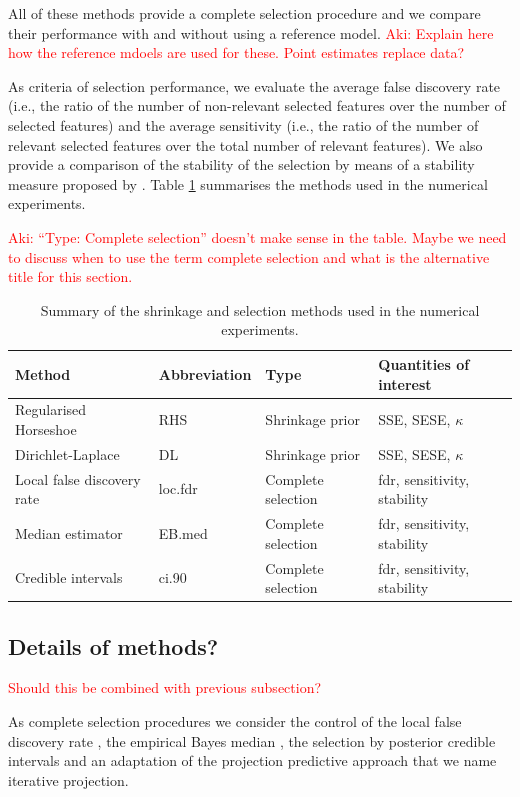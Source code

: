 \documentclass[american,]{article}
\theoremstyle{definition}
\newcommand{\note}[1]{\textcolor{red}{#1}}
\begin{document}
All of these methods provide a complete selection procedure and we
compare their performance with and without using a reference model.
\note{Aki: Explain here how the reference mdoels are used for these. Point
  estimates replace data?}

As criteria of selection performance, we evaluate the average false
discovery rate (i.e., the ratio of the number of non-relevant selected
features over the number of selected features) and the average
sensitivity (i.e., the ratio of the number of relevant selected
features over the total number of relevant features). We also provide
a comparison of the stability of the selection by means of a stability
measure proposed by \cite{paper:stability}. Table \ref{tab:comparison}
summarises the methods used in the numerical experiments.

\note{Aki: ``Type: Complete selection'' doesn't make sense in the table. Maybe we need to discuss when to use the term complete selection and what is the alternative title for this section.}

\begin{table}[tp]
\scriptsize
\centering
\begin{tabular}{l|l|l|l}
 Method & Abbreviation & Type & Quantities of interest \\ 
  \hline
 Regularised Horseshoe & RHS & Shrinkage prior & SSE, SESE, $\kappa$ \\
 Dirichlet-Laplace & DL & Shrinkage prior & SSE, SESE, $\kappa$ \\
 Local false discovery rate & loc.fdr & Complete selection & fdr, sensitivity, stability \\
 Median estimator & EB.med & Complete selection & fdr, sensitivity, stability \\
 Credible intervals & ci.90 & Complete selection & fdr, sensitivity, stability \\
\end{tabular}
\caption{Summary of the shrinkage and selection methods used in the numerical experiments.}
\label{tab:comparison}
\end{table}

\hypertarget{complete-selection}{%
\subsection{Details of methods?}\label{complete-selection}}

\note{Should this be combined with previous subsection?}

As complete selection procedures we consider the control of the local
false discovery rate \citep{paper:efron, efron2012large}, the
empirical Bayes median \citep{johnstone2004needles}, the selection
by posterior credible intervals and an adaptation of the projection 
predictive approach that we name iterative projection.\
\end{document}
